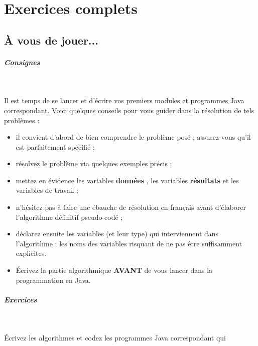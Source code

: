 \documentclass[11pt,a4paper]{article}
\begin{document}
        \section{Exercices complets}\subsection{\`A vous de jouer...}
			
		\subparagraph{Consignes} 
		
					\textcolor{white}{.} \par
				
          Il est temps de se lancer et d'\'ecrire vos premiers modules et programmes Java correspondant. 
          Voici quelques conseils pour vous guider dans la r\'esolution de tels probl\`emes :
          
					\begin{itemize}
				
			\item il convient d'abord de bien comprendre le probl\`eme pos\'e ; assurez-vous qu'il est parfaitement sp\'ecifi\'e ;
			\item r\'esolvez le probl\`eme via quelques exemples pr\'ecis ;
			\item mettez en \'evidence les variables \textbf{\guillemotleft  donn\'ees \guillemotright }, les variables \textbf{\guillemotleft  r\'esultats \guillemotright } et les variables de travail ;
			\item n'h\'esitez pas \`a faire une \'ebauche de r\'esolution en fran\c cais avant d'\'elaborer l'algorithme d\'efinitif pseudo-cod\'e ;
			\item d\'eclarez ensuite les variables (et leur type) qui interviennent dans l'algorithme ; les noms des variables risquant de ne pas \^etre suffisamment explicites.
			\item \'Ecrivez la partie algorithmique \textbf{AVANT} de vous lancer dans la programmation en Java.
					\end{itemize}
				
            \par
        
			
		\subparagraph{Exercices} 
		
					\textcolor{white}{.} \par
				
        \'Ecrivez les algorithmes et codez les programmes Java correspondant qui 
          
\end{document}
